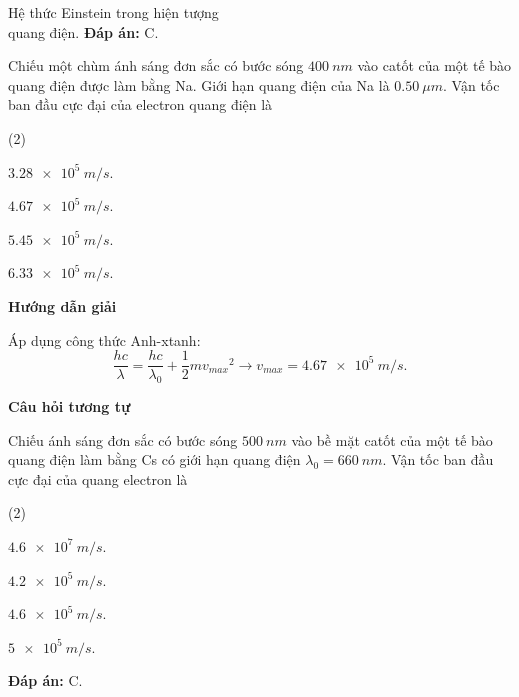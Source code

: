 \begin{dang}{Hệ thức Einstein trong hiện tượng\\ quang điện.}
{\textbf{Đáp án:} C.
}

{Chiếu một chùm ánh sáng đơn sắc có bước sóng $ \SI{400}{nm} $ vào catốt của một tế bào quang điện được làm bằng Na. Giới hạn quang điện của Na là $ \SI{0,50}{\mu m} $. Vận tốc ban đầu cực đại của electron quang điện là
\begin{mcq}(2)
	\item $ \SI{3,28 e5}{m/s} $.
	\item $ \SI{4,67 e5}{m/s} $.
	\item $ \SI{5,45 e5}{m/s} $.
	\item $ \SI{6,33 e5}{m/s} $.
\end{mcq}
}
{\begin{center}
	\textbf{Hướng dẫn giải}
\end{center}

Áp dụng công thức Anh-xtanh:
\begin{equation*}
	\dfrac{hc}{\lambda} = \dfrac{hc}{\lambda_{0}} + \dfrac{1}{2}m{v_{max}}^{2} \rightarrow v_{max} = \SI{4,67 e5}{m/s}.
\end{equation*}

\begin{center}
	\textbf{Câu hỏi tương tự}
\end{center}

Chiếu ánh sáng đơn sắc có bước sóng $ \SI{500}{nm} $ vào bề mặt catốt của một tế bào quang điện làm bằng Cs có giới hạn quang điện $ \lambda_{0} = \SI{660}{nm} $.  Vận tốc ban đầu cực đại của quang electron là

\begin{mcq}(2)
	\item $ \SI{4,6 e7}{m/s} $.
	\item $ \SI{4,2 e5}{m/s} $.
	\item $ \SI{4,6 e5}{m/s} $.
	\item $ \SI{5 e5}{m/s} $.
\end{mcq}

\textbf{Đáp án:} C.
}

\end{dang}

